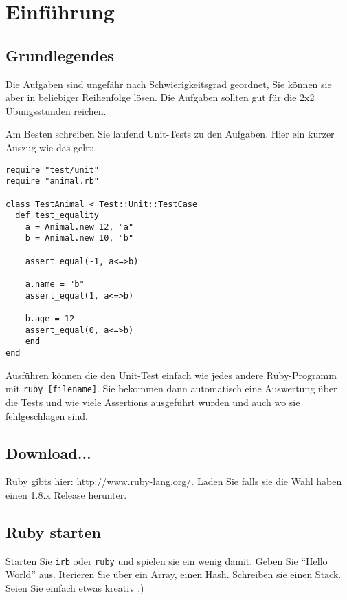 \documentclass[a4paper,11pt,oneside]{scrbook}
\begin{document}
\renewcommand{\theequation}{\thesection.\arabic}
\setcapindent*{1em}


\chapter{Einführung} %
\label{cha:einführung}

\section{Grundlegendes} %
\label{sec:Grundlegendes}
Die Aufgaben sind ungefähr nach Schwierigkeitsgrad geordnet, Sie können sie aber in beliebiger Reihenfolge lösen. Die Aufgaben sollten gut für die 2x2 Übungsstunden reichen.

Am Besten schreiben Sie laufend Unit-Tests zu den Aufgaben. Hier ein kurzer Auszug wie das geht:

\begin{lstlisting}
require "test/unit"
require "animal.rb"

class TestAnimal < Test::Unit::TestCase
  def test_equality
    a = Animal.new 12, "a"
    b = Animal.new 10, "b"
    
    assert_equal(-1, a<=>b)
    
    a.name = "b"
    assert_equal(1, a<=>b)
    
    b.age = 12
    assert_equal(0, a<=>b)
    end
end
\end{lstlisting}

Ausführen können die den Unit-Test einfach wie jedes andere Ruby-Programm mit \texttt{ruby [filename]}. Sie bekommen dann automatisch eine Auswertung über die Tests und wie viele Assertions ausgeführt wurden und auch wo sie fehlgeschlagen sind.




\section{Download...} %
\label{sec:download_}
Ruby gibts hier: \url{http://www.ruby-lang.org/}. Laden Sie falls sie die Wahl haben einen 1.8.x Release herunter.

\section{Ruby starten} %
\label{sec:ruby_starten}
Starten Sie \texttt{irb} oder \texttt{ruby} und spielen sie ein wenig damit. Geben Sie “Hello World” aus. Iterieren Sie über ein Array, einen Hash. Schreiben sie einen Stack. Seien Sie einfach etwas kreativ :)
\end{document}
